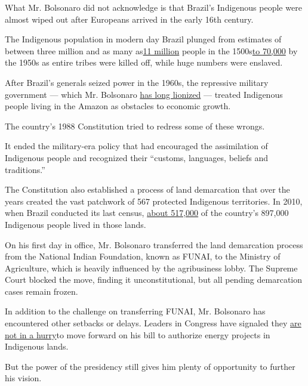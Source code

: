 What Mr. Bolsonaro did not acknowledge is that Brazil's Indigenous
people were almost wiped out after Europeans arrived in the early 16th
century.

The Indigenous population in modern day Brazil plunged from estimates of
between three million and as many
as\href{https://www.survivalinternational.org/tribes/brazilian}{11
million} people in the
1500s\href{http://www.funai.gov.br/index.php/indios-no-brasil/quem-sao}{to
70,000} by the 1950s as entire tribes were killed off, while huge
numbers were enslaved.

After Brazil's generals seized power in the 1960s, the repressive
military government --- which Mr. Bolsonaro
\href{https://www.nytimes3xbfgragh.onion/2019/03/29/world/americas/brazil-bolsonaro-coup.html}{has
long lionized} --- treated Indigenous people living in the Amazon as
obstacles to economic growth.

The country's 1988 Constitution tried to redress some of these wrongs.

It ended the military-era policy that had encouraged the assimilation of
Indigenous people and recognized their ``customs, languages, beliefs and
traditions.''

The Constitution also established a process of land demarcation that
over the years created the vast patchwork of 567 protected Indigenous
territories. In 2010, when Brazil conducted its last census,
\href{https://censo2010.ibge.gov.br/noticias-censo?busca=1\&id=3\&idnoticia=2194\&t=censo-2010-poblacao-indigena-896-9-mil-tem-305-etnias-fala-274\&view=noticia}{about
517,000} of the country's 897,000 Indigenous people lived in those
lands.

On his first day in office, Mr. Bolsonaro transferred the land
demarcation process from the National Indian Foundation, known as FUNAI,
to the Ministry of Agriculture, which is heavily influenced by the
agribusiness lobby. The Supreme Court blocked the move, finding it
unconstitutional, but all pending demarcation cases remain frozen.

In addition to the challenge on transferring FUNAI, Mr. Bolsonaro has
encountered other setbacks or delays. Leaders in Congress have signaled
they
\href{https://g1.globo.com/politica/noticia/2020/02/18/momento-nao-e-adequado-para-discutir-projeto-sobre-mineracao-em-terras-indigenas-diz-maia.ghtml}{are
not in a hurry}to move forward on his bill to authorize energy projects
in Indigenous lands.

But the power of the presidency still gives him plenty of opportunity to
further his vision.

